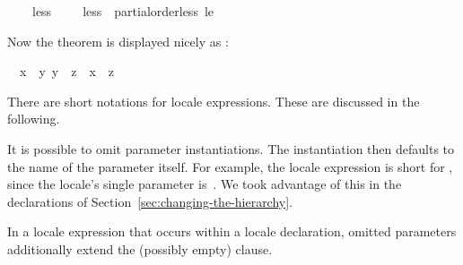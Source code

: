 \begin{isabellebody}
\ \ \ \ less{}\ {}\ {}{}{}\ {}{}{}\ \ {}less{}\ {}\ partial{}order{}less\ le{}{}%
\begin{isamarkuptext}%
Now the theorem is displayed nicely as
  :
  \begin{isabelle}%
\ \ {}{}x\ {}\ {}y{}\ {}y\ {}\ {}z{}\ {}\ {}x\ {}\ {}z%
\end{isabelle}%
\end{isamarkuptext}%
\isamarkuptrue%
%
\begin{isamarkuptext}%
There are short notations for locale expressions.  These are
  discussed in the following.%
\end{isamarkuptext}%
\isamarkuptrue%
%
\isamarkuptrue%
%
\begin{isamarkuptext}%
It is possible to omit parameter instantiations.  The
  instantiation then defaults to the name of
  the parameter itself.  For example, the locale expression  is short for , since the
  locale's single parameter is~.  We took advantage of this
  in the  declarations of
  Section~\ref{sec:changing-the-hierarchy}.%
\end{isamarkuptext}%
\isamarkuptrue%
%
\isamarkuptrue%
%
\begin{isamarkuptext}%
In a locale expression that occurs within a locale
  declaration, omitted parameters additionally extend the (possibly
  empty)  clause.


\end{isamarkuptext}
\end{isabellebody}
